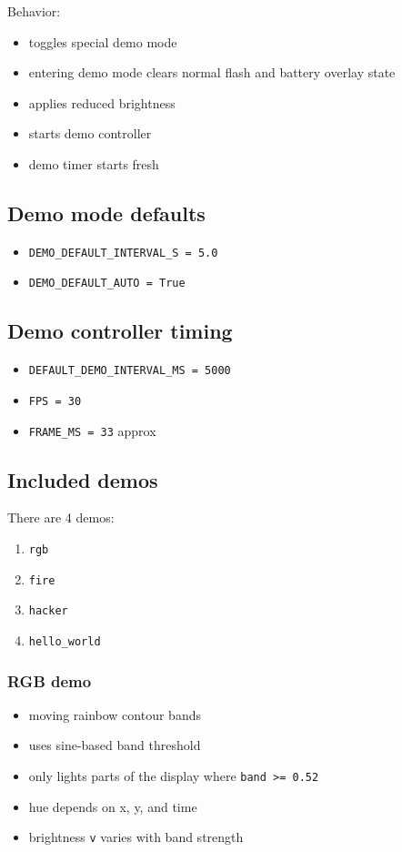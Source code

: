 \documentclass[11pt]{article}
\begin{document}
Behavior:
\begin{itemize}
  \item toggles special demo mode
  \item entering demo mode clears normal flash and battery overlay state
  \item applies reduced brightness
  \item starts demo controller
  \item demo timer starts fresh
\end{itemize}

\subsection{Demo mode defaults}
\begin{itemize}
  \item \texttt{DEMO\_DEFAULT\_INTERVAL\_S = 5.0}
  \item \texttt{DEMO\_DEFAULT\_AUTO = True}
\end{itemize}

\subsection{Demo controller timing}
\begin{itemize}
  \item \texttt{DEFAULT\_DEMO\_INTERVAL\_MS = 5000}
  \item \texttt{FPS = 30}
  \item \texttt{FRAME\_MS = 33} approx
\end{itemize}

\subsection{Included demos}
There are 4 demos:
\begin{enumerate}
  \item \texttt{rgb}
  \item \texttt{fire}
  \item \texttt{hacker}
  \item \texttt{hello\_world}
\end{enumerate}

\subsubsection*{RGB demo}
\begin{itemize}
  \item moving rainbow contour bands
  \item uses sine-based band threshold
  \item only lights parts of the display where \texttt{band >= 0.52}
  \item hue depends on x, y, and time
  \item brightness \texttt{v} varies with band strength
\end{itemize}
\end{document}

